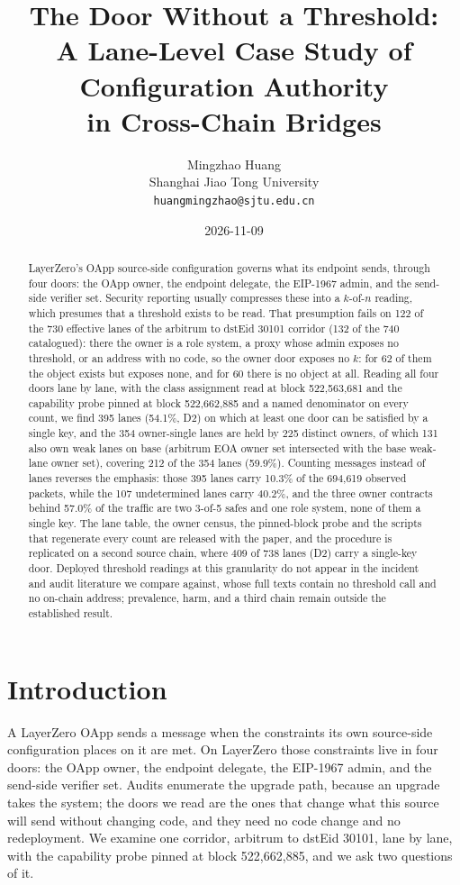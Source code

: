 \documentclass[10pt,a4paper]{article}
\title{\bf The Door Without a Threshold:\\
A Lane-Level Case Study of Configuration Authority\\
in Cross-Chain Bridges}
\author{\large Mingzhao Huang\\[2pt]
\normalsize Shanghai Jiao Tong University\\
\texttt{huangmingzhao@sjtu.edu.cn}}
\date{2026-11-09}
\begin{document}
\maketitle

\begin{abstract}
LayerZero's OApp source-side configuration governs what its endpoint sends, through four doors: the OApp owner, the
endpoint delegate, the EIP-1967 admin, and the send-side verifier set. Security reporting usually compresses
these into a $k$-of-$n$ reading, which presumes that a threshold exists to be read. That presumption fails on
122 of the 730 effective lanes of the arbitrum to dstEid 30101 corridor (132 of the 740 catalogued): there the owner is a role system, a
proxy whose admin exposes no threshold, or an address with no code, so the owner door exposes no $k$: for 62 of them the object exists but exposes none, and for 60
there is no object at all. Reading all four doors lane by lane, with the class assignment read at block 522,563,681 and the capability probe pinned at block
522,662,885 and a named denominator on every count, we find 395 lanes (54.1\%, D2) on which at least one door
can be satisfied by a single key, and the 354 owner-single lanes are held by 225 distinct owners, of which 131 also own weak lanes on base (arbitrum EOA owner set intersected with the base weak-lane owner
set), covering 212 of the 354 lanes (59.9\%). Counting messages instead of lanes reverses the emphasis:
those 395 lanes carry 10.3\% of the 694,619 observed packets, while the 107 undetermined lanes carry 40.2\%,
and the three owner contracts behind 57.0\% of the traffic are two 3-of-5 safes and one role system, none of
them a single key. The lane table, the owner census, the pinned-block probe and the scripts that regenerate
every count are released with the paper, and the procedure is replicated on a second source chain, where 409
of 738 lanes (D2) carry a single-key door. Deployed threshold readings at this granularity do not appear in
the incident and audit literature we compare against, whose full texts contain no threshold call and no
on-chain address; prevalence, harm, and a third chain remain outside the established result.
\end{abstract}

\section{Introduction}
\label{sec:intro}

A LayerZero OApp sends a message when the constraints its own source-side configuration places on it are met. On LayerZero those constraints live in four doors: the OApp owner, the endpoint delegate, the EIP-1967
admin, and the send-side verifier set. Audits enumerate the upgrade path, because an upgrade takes the
system; the doors we read are the ones that change what this source will send without changing code, and
they need no code change and no redeployment. We examine one corridor, arbitrum to dstEid 30101, lane by lane, with the
capability probe pinned at block 522,662,885, and we ask two questions of it.
\end{document}

